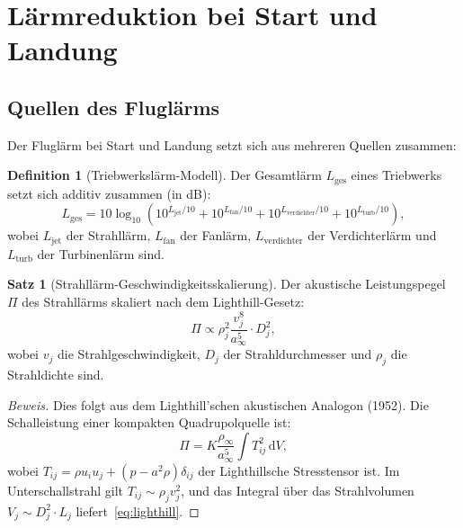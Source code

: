 ﻿\documentclass[12pt,a4paper]{article}
\theoremstyle{definition}
\newtheorem{definition}{Definition}[section]
\newtheorem{satz}{Satz}[section]
\theoremstyle{remark}
\newenvironment{beweis}{\begin{proof}[Beweis]}{\end{proof}}
\newcommand{\dd}{\,\mathrm{d}}
\begin{document}
\section{Lärmreduktion bei Start und Landung}
\label{sec:startlandung}

\subsection{Quellen des Fluglärms}

Der Fluglärm bei Start und Landung setzt sich aus mehreren Quellen zusammen:

\begin{definition}[Triebwerkslärm-Modell]
  Der Gesamtlärm $L_\text{ges}$ eines Triebwerks setzt sich additiv zusammen (in dB):
  \begin{equation}
    L_\text{ges} = 10 \log_{10}\!\left(10^{L_\text{jet}/10} + 10^{L_\text{fan}/10}
                              + 10^{L_\text{verdichter}/10} + 10^{L_\text{turb}/10}\right),
    \label{eq:gesamtlaerm}
  \end{equation}
  wobei $L_\text{jet}$ der Strahllärm, $L_\text{fan}$ der Fanlärm,
  $L_\text{verdichter}$ der Verdichterlärm und $L_\text{turb}$ der Turbinenlärm sind.
\end{definition}

\begin{satz}[Strahllärm-Geschwindigkeitsskalierung]
  \label{satz:strahllärm}
  Der akustische Leistungspegel $\Pi$ des Strahllärms skaliert nach dem Lighthill-Gesetz:
  \begin{equation}
    \Pi \propto \rho_j^2 \frac{v_j^8}{a_\infty^5} \cdot D_j^2,
    \label{eq:lighthill}
  \end{equation}
  wobei $v_j$ die Strahlgeschwindigkeit, $D_j$ der Strahldurchmesser und $\rho_j$ die
  Strahldichte sind.
\end{satz}

\begin{beweis}
  Dies folgt aus dem Lighthill'schen akustischen Analogon (1952). Die Schalleistung einer
  kompakten Quadrupolquelle ist:
  \begin{equation}
    \Pi = K \frac{\rho_\infty}{a_\infty^5} \int T_{ij}^2 \dd V,
  \end{equation}
  wobei $T_{ij} = \rho u_i u_j + (p - a^2 \rho)\delta_{ij}$ der Lighthillsche Stresstensor
  ist. Im Unterschallstrahl gilt $T_{ij} \sim \rho_j v_j^2$, und das Integral über das
  Strahlvolumen $V_j \sim D_j^2 \cdot L_j$ liefert~\eqref{eq:lighthill}. \qedhere
\end{beweis}
\end{document}
